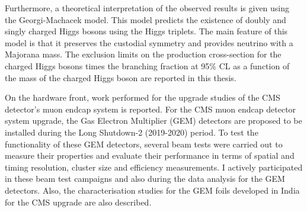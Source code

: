 Furthermore, a theoretical interpretation of the observed results is given using the Georgi-Machacek model. This model predicts the existence of doubly and singly charged Higgs bosons using the Higgs triplets. The main feature of this model is that it preserves the custodial symmetry and provides neutrino with a Majorana mass. The exclusion limits on the production cross-section for the charged Higgs bosons times the branching fraction at 95\% CL as a function of the mass of the charged Higgs boson are reported in this thesis.



On the hardware front, work performed for the upgrade studies of the CMS detector's muon endcap system is reported. For the CMS muon endcap detector system upgrade, the Gas Electron Multiplier (GEM) detectors are proposed to be installed during the Long Shutdown-2 (2019-2020) period. To test the functionality of these GEM detectors, several beam tests were carried out to measure their properties and evaluate their performance in terms of spatial and timing resolution, cluster size and efficiency measurements. I actively participated in these beam test campaigns and also during the data analysis for the GEM detectors. Also, the characterisation studies for the GEM foils developed in India for the CMS upgrade are also described.

